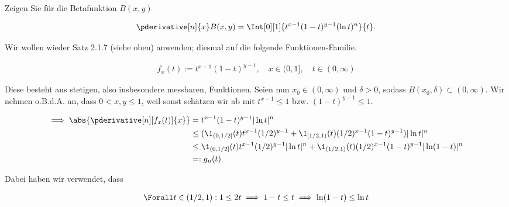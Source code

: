 
\begin{exercise}

Zeigen Sie für die Betafunktion $B(x, y)$

\begin{align*}
    \pderivative[n]{x}
    B(x, y)
    =
    \Int[0][1]
    {
        t^{x-1}
        (1 - t)^{y-1}
        (\ln t)^n
    }{t}.
\end{align*}

\end{exercise}


\begin{solution}

Wir wollen wieder Satz 2.1.7 (siehe oben) anwenden; diesmal auf die folgende Funktionen-Familie.

\begin{align*}
    f_x(t) := t^{x-1} (1 - t)^{y-1},
    \quad
    x \in (0, 1],
    \quad
    t \in (0, \infty)
\end{align*}

Diese besteht aus stetigen, also insbesondere messbaren, Funktionen.
Seien nun $x_0 \in (0, \infty)$ und $\delta > 0$, sodass $B(x_0, \delta) \subset (0, \infty)$.
Wir nehmen o.B.d.A. an, dass $0 < x, y \leq 1$, weil sonst schätzen wir ab mit $t^{x-1} \leq 1$ bzw. $(1 - t)^{y-1} \leq 1$.

\begin{align*}
    \implies
    \abs
    {
        \pderivative[n][f_x(t)]{x}
    }
    & =
    t^{x-1} (1 - t)^{y-1} |\ln t|^n \\
    & \leq
    (
        \1_{(0, 1/2]}(t)
        t^{x-1} (1/2)^{y-1}
        +
        \1_{[1/2, 1)}(t)
        (1/2)^{x-1} (1 - t)^{y-1}
    )
    |\ln t|^n \\
    & \leq
    \1_{(0, 1/2]}(t)
    t^{x-1} (1/2)^{y-1}
    |\ln t|^n
    +
    \1_{(1/2, 1)}(t)
    (1/2)^{x-1} (1 - t)^{y-1}
    |\ln(1 - t)|^n \\
    & =:
    g_n(t)
\end{align*}

Dabei haben wir verwendet, dass

\begin{align*}
    \Forall t \in (1/2, 1):
    1 \leq 2 t
    \implies
    1 - t \leq t
    \implies
    \ln(1 - t) \leq \ln t
\end{align*}


\end{solution}
